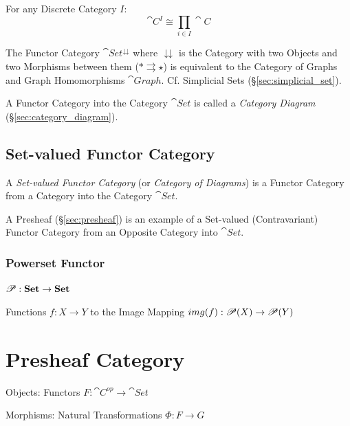 For any Discrete Category $I$:
\[
  \cat{C}^I \cong \prod_{i \in I} \cat{C}
\]

The Functor Category $\cat{Set}^\downdownarrows$ where
$\downdownarrows$ is the Category with two Objects and two Morphisms
between them ($* \rightrightarrows \star$) is equivalent to the
Category of Graphs and Graph Homomorphisms $\cat{Graph}$. Cf.
Simplicial Sets (\S\ref{sec:simplicial_set}).

A Functor Category into the Category $\cat{Set}$ is called a
\emph{Category Diagram} (\S\ref{sec:category_diagram}).



\subsection{Set-valued Functor Category}\label{sec:setvalued_functor}

A \emph{Set-valued Functor Category} (or \emph{Category of Diagrams})
is a Functor Category from a Category into the Category
$\cat{Set}$.

A Presheaf (\S\ref{sec:presheaf}) is an example of a Set-valued
(Contravariant) Functor Category from an Opposite Category into
$\cat{Set}$.



\subsubsection{Powerset Functor}\label{sec:powerset_functor}

$\mathscr{P} : \mathbf{Set} \rightarrow \mathbf{Set}$

Functions $f : X \rightarrow Y$ to the Image Mapping $img(f) :
\mathscr{P}(X) \rightarrow \mathscr{P}(Y)$



\section{Presheaf Category}\label{sec:presheaf_category}

Objects: Functors $F: \cat{C}^{op} \rightarrow \cat{Set}$

Morphisms: Natural Transformations $\Phi : F \rightarrow G$

